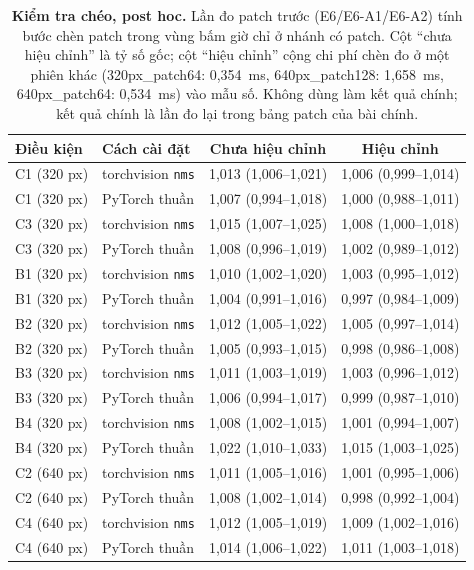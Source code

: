 \begin{table}[t]
\centering\small
\caption{\textbf{Kiểm tra chéo, post hoc.} Lần đo patch trước (E6/E6-A1/E6-A2) tính bước chèn patch trong vùng bấm giờ chỉ ở nhánh có patch. Cột ``chưa hiệu chỉnh'' là tỷ số gốc; cột ``hiệu chỉnh'' cộng chi phí chèn đo ở một phiên khác (320px_patch64: 0,354~ms, 640px_patch128: 1,658~ms, 640px_patch64: 0,534~ms) vào mẫu số. Không dùng làm kết quả chính; kết quả chính là lần đo lại trong bảng patch của bài chính.}
\label{tab:supp_corrected}
\begin{tabular}{@{}llcc@{}}
\toprule
Điều kiện & Cách cài đặt & Chưa hiệu chỉnh & Hiệu chỉnh \\
\midrule
C1 (320 px) & torchvision \texttt{nms} & 1,013 (1,006--1,021) & 1,006 (0,999--1,014) \\
C1 (320 px) & PyTorch thuần & 1,007 (0,994--1,018) & 1,000 (0,988--1,011) \\
C3 (320 px) & torchvision \texttt{nms} & 1,015 (1,007--1,025) & 1,008 (1,000--1,018) \\
C3 (320 px) & PyTorch thuần & 1,008 (0,996--1,019) & 1,002 (0,989--1,012) \\
B1 (320 px) & torchvision \texttt{nms} & 1,010 (1,002--1,020) & 1,003 (0,995--1,012) \\
B1 (320 px) & PyTorch thuần & 1,004 (0,991--1,016) & 0,997 (0,984--1,009) \\
B2 (320 px) & torchvision \texttt{nms} & 1,012 (1,005--1,022) & 1,005 (0,997--1,014) \\
B2 (320 px) & PyTorch thuần & 1,005 (0,993--1,015) & 0,998 (0,986--1,008) \\
B3 (320 px) & torchvision \texttt{nms} & 1,011 (1,003--1,019) & 1,003 (0,996--1,012) \\
B3 (320 px) & PyTorch thuần & 1,006 (0,994--1,017) & 0,999 (0,987--1,010) \\
B4 (320 px) & torchvision \texttt{nms} & 1,008 (1,002--1,015) & 1,001 (0,994--1,007) \\
B4 (320 px) & PyTorch thuần & 1,022 (1,010--1,033) & 1,015 (1,003--1,025) \\
C2 (640 px) & torchvision \texttt{nms} & 1,011 (1,005--1,016) & 1,001 (0,995--1,006) \\
C2 (640 px) & PyTorch thuần & 1,008 (1,002--1,014) & 0,998 (0,992--1,004) \\
C4 (640 px) & torchvision \texttt{nms} & 1,012 (1,005--1,019) & 1,009 (1,002--1,016) \\
C4 (640 px) & PyTorch thuần & 1,014 (1,006--1,022) & 1,011 (1,003--1,018) \\
\bottomrule
\end{tabular}
\end{table}
